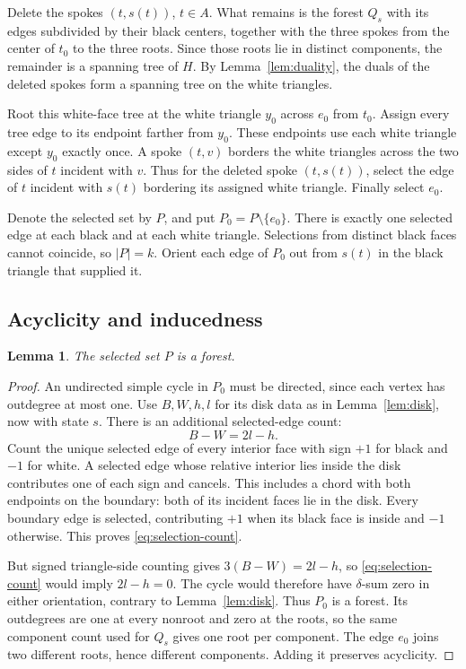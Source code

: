 \documentclass[11pt]{article}
\newtheorem{lemma}[theorem]{Lemma}
\theoremstyle{remark}
\newcommand{\abs}[1]{\left|#1\right|}
\numberwithin{equation}{section}
\begin{document}
Delete the spokes \((t,s(t))\), \(t\in A\).
What remains is the forest \(Q_s\) with its edges
subdivided by their black centers, together with
the three spokes from the center of \(t_0\) to the
three roots. Since those roots lie in distinct
components, the remainder is a spanning tree of \(H\).
By Lemma~\ref{lem:duality}, the duals of the deleted
spokes form a spanning tree on the white triangles.

Root this white-face tree at the white triangle \(y_0\)
across \(e_0\) from \(t_0\). Assign every tree edge to
its endpoint farther from \(y_0\). These endpoints
use each white triangle except \(y_0\) exactly once.
A spoke \((t,v)\) borders the white triangles across
the two sides of \(t\) incident with \(v\).
Thus for the deleted spoke \((t,s(t))\), select the
edge of \(t\) incident with \(s(t)\) bordering its
assigned white triangle. Finally select \(e_0\).

Denote the selected set by \(P\), and put
\(P_0=P\setminus\{e_0\}\).
There is exactly one selected edge at each black
and at each white triangle. Selections from distinct
black faces cannot coincide, so \(\abs P=k\).
Orient each edge of \(P_0\) out from \(s(t)\) in the
black triangle that supplied it.

\subsection{Acyclicity and inducedness}

\begin{lemma}\label{lem:P-forest}
The selected set \(P\) is a forest.
\end{lemma}

\begin{proof}
An undirected simple cycle in \(P_0\) must be
directed, since each vertex has outdegree at most one.
Use \(B,W,h,l\) for its disk data as in
Lemma~\ref{lem:disk}, now with state \(s\).
There is an additional selected-edge count:
\begin{equation}\label{eq:selection-count}
 B-W=2l-h.
\end{equation}
Count the unique selected edge of every interior
face with sign \(+1\) for black and \(-1\) for white.
A selected edge whose relative interior lies inside the disk
contributes one of each sign and cancels. This includes a chord
with both endpoints on the boundary: both of its incident faces
lie in the disk. Every boundary edge
is selected, contributing \(+1\) when its black
face is inside and \(-1\) otherwise. This proves
\eqref{eq:selection-count}.

But signed triangle-side counting gives
\(3(B-W)=2l-h\), so \eqref{eq:selection-count}
would imply \(2l-h=0\). The cycle would therefore have
\(\delta\)-sum zero in either orientation, contrary to
Lemma~\ref{lem:disk}. Thus \(P_0\) is a forest.
Its outdegrees are one at every nonroot and zero at
the roots, so the same component count used for
\(Q_s\) gives one root per component.
The edge \(e_0\) joins two different roots, hence
different components. Adding it preserves acyclicity.
\end{proof}
\end{document}
